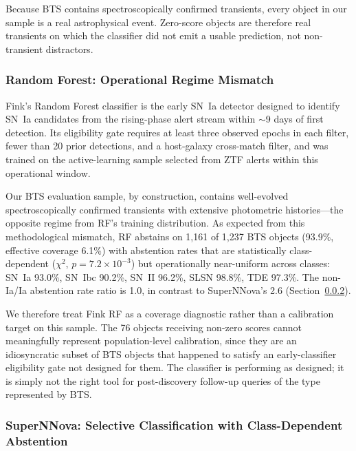 \documentclass[twocolumn]{aastex631}
\begin{document}
Because BTS contains spectroscopically confirmed transients, every object in our sample is a real astrophysical event. Zero-score objects are therefore real transients on which the classifier did not emit a usable prediction, not non-transient distractors.

\subsubsection{Random Forest: Operational Regime Mismatch} \label{sec:fink_rf}

Fink's Random Forest classifier \citep{leoni2022} is the early SN~Ia detector designed to identify SN~Ia candidates from the rising-phase alert stream within $\sim$9 days of first detection. Its eligibility gate requires at least three observed epochs in each filter, fewer than 20 prior detections, and a host-galaxy cross-match filter, and was trained on the active-learning sample selected from ZTF alerts within this operational window.

Our BTS evaluation sample, by construction, contains well-evolved spectroscopically confirmed transients with extensive photometric histories---the opposite regime from RF's training distribution. As expected from this methodological mismatch, RF abstains on 1,161 of 1,237 BTS objects (93.9\%, effective coverage 6.1\%) with abstention rates that are statistically class-dependent ($\chi^2$, $p = 7.2 \times 10^{-3}$) but operationally near-uniform across classes: SN~Ia 93.0\%, SN~Ibc 90.2\%, SN~II 96.2\%, SLSN 98.8\%, TDE 97.3\%. The non-Ia/Ia abstention rate ratio is 1.0, in contrast to SuperNNova's 2.6 (Section~\ref{sec:fink_snn}).

We therefore treat Fink RF as a coverage diagnostic rather than a calibration target on this sample. The 76 objects receiving non-zero scores cannot meaningfully represent population-level calibration, since they are an idiosyncratic subset of BTS objects that happened to satisfy an early-classifier eligibility gate not designed for them. The classifier is performing as designed; it is simply not the right tool for post-discovery follow-up queries of the type represented by BTS.

\subsubsection{SuperNNova: Selective Classification with Class-Dependent Abstention} \label{sec:fink_snn}
\end{document}
